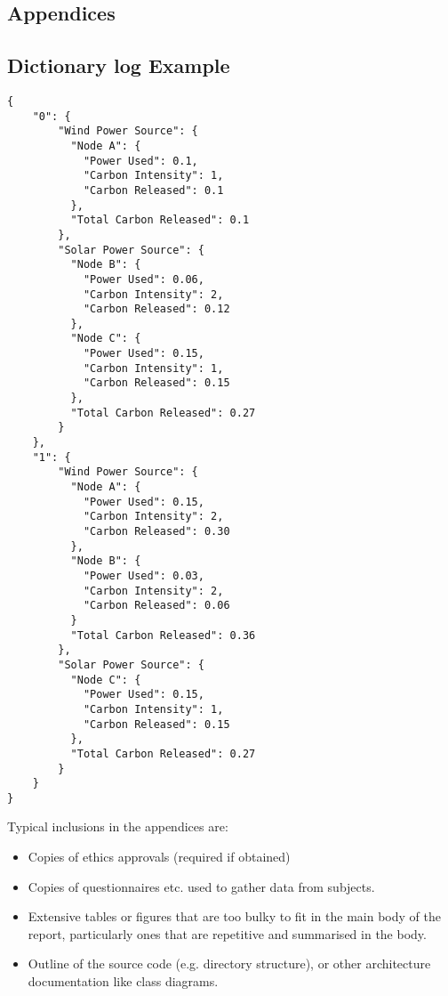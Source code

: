 \documentclass{l4proj}
\begin{document}
\begin{appendices}
\chapter{Appendices}

\section{Dictionary log Example}
\begin{lstlisting}[caption={Example dictionary structure used by the power domain.},label={lst:dic-log}]
{
    "0": {
        "Wind Power Source": {
          "Node A": {
            "Power Used": 0.1,
            "Carbon Intensity": 1,
            "Carbon Released": 0.1
          },
          "Total Carbon Released": 0.1
        },
        "Solar Power Source": {
          "Node B": {
            "Power Used": 0.06,
            "Carbon Intensity": 2,
            "Carbon Released": 0.12
          },
          "Node C": {
            "Power Used": 0.15,
            "Carbon Intensity": 1,
            "Carbon Released": 0.15
          },
          "Total Carbon Released": 0.27
        }
    },
    "1": {
        "Wind Power Source": {
          "Node A": {
            "Power Used": 0.15,
            "Carbon Intensity": 2,
            "Carbon Released": 0.30
          },
          "Node B": {
            "Power Used": 0.03,
            "Carbon Intensity": 2,
            "Carbon Released": 0.06
          }
          "Total Carbon Released": 0.36
        },
        "Solar Power Source": {
          "Node C": {
            "Power Used": 0.15,
            "Carbon Intensity": 1,
            "Carbon Released": 0.15
          },
          "Total Carbon Released": 0.27
        }
    }
}
\end{lstlisting}
Typical inclusions in the appendices are:

\begin{itemize}
\item
  Copies of ethics approvals (required if obtained)
\item
  Copies of questionnaires etc. used to gather data from subjects.
\item
  Extensive tables or figures that are too bulky to fit in the main body of
  the report, particularly ones that are repetitive and summarised in the body.

\item Outline of the source code (e.g. directory structure), or other architecture documentation like class diagrams.


\end{itemize}
\end{appendices}
\end{document}
